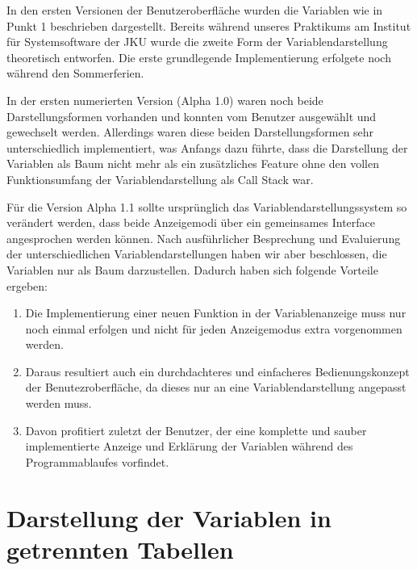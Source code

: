 In den ersten Versionen der Benutzeroberfläche wurden die Variablen wie in Punkt 1 beschrieben dargestellt. Bereits während unseres Praktikums am Institut für Systemsoftware der JKU wurde die zweite Form der Variablendarstellung theoretisch entworfen. Die erste grundlegende Implementierung erfolgete noch während den Sommerferien.
\newline

In der ersten numerierten Version (Alpha 1.0) waren noch beide Darstellungsformen vorhanden und konnten vom Benutzer ausgewählt und gewechselt werden. Allerdings waren diese beiden Darstellungsformen sehr unterschiedlich implementiert, was Anfangs dazu führte, dass die Darstellung der Variablen als Baum nicht mehr als ein zusätzliches Feature ohne den vollen Funktionsumfang der Variablendarstellung als Call Stack war.
\newline

Für die Version Alpha 1.1 sollte ursprünglich das Variablendarstellungssystem so verändert werden, dass beide Anzeigemodi über ein gemeinsames Interface angesprochen werden können. Nach ausführlicher Besprechung und Evaluierung der unterschiedlichen Variablendarstellungen haben wir aber beschlossen, die Variablen nur als Baum darzustellen. Dadurch haben sich folgende Vorteile ergeben:
\begin{enumerate}
\item Die Implementierung einer neuen Funktion in der Variablenanzeige muss nur noch einmal erfolgen und nicht für jeden Anzeigemodus extra vorgenommen werden.
\item Daraus resultiert auch ein durchdachteres und einfacheres Bedienungskonzept der Benutezroberfläche, da dieses nur an eine Variablendarstellung angepasst werden muss.
\item Davon profitiert zuletzt der Benutzer, der eine komplette und sauber implementierte Anzeige und Erklärung der Variablen während des Programmablaufes vorfindet.
\end{enumerate}

\section{Darstellung der Variablen in getrennten Tabellen}

